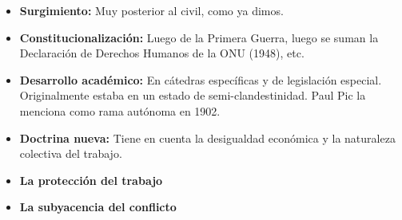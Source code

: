 \documentclass[../main.tex]{subfiles}
\begin{document}
	\begin{itemize}
		\item \textbf{Surgimiento:} Muy posterior al civil, como ya dimos.
		
		\item \textbf{Constitucionalización:} Luego de la Primera Guerra, luego se suman la Declaración de Derechos Humanos de la ONU (1948), etc.
		
		\item \textbf{Desarrollo académico:} En cátedras específicas y de legislación especial.
		Originalmente estaba en un estado de semi-clandestinidad.
		Paul Pic la menciona como rama autónoma en 1902.
		
		\item \textbf{Doctrina nueva:} Tiene en cuenta la desigualdad económica y la naturaleza colectiva del trabajo.
		
		\item \textbf{La protección del trabajo}
		
		\item \textbf{La subyacencia del conflicto}		
	\end{itemize}
\end{document}
